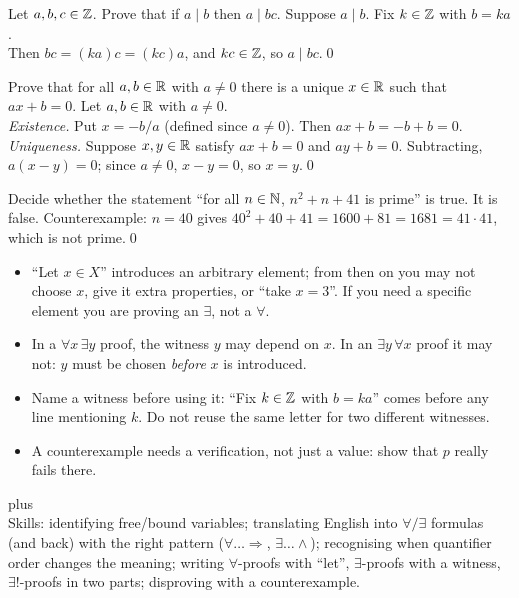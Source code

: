 \begin{hexample}
Let $a,b,c\in\mathbb{Z}$. Prove that if $a\mid b$ then $a\mid bc$.
\solution
Suppose $a\mid b$. Fix $k\in\mathbb{Z}$ with $b=ka$.\\
Then $bc=(ka)c=(kc)a$, and $kc\in\mathbb{Z}$, so $a\mid bc$.\qed
\end{hexample}

\begin{hexample}
Prove that for all $a,b\in\mathbb{R}$ with $a\neq0$ there is a unique $x\in\mathbb{R}$ such that $ax+b=0$.
\solution
Let $a,b\in\mathbb{R}$ with $a\neq0$.\\
\emph{Existence.} Put $x=-b/a$ (defined since $a\neq0$). Then $ax+b=-b+b=0$.\\
\emph{Uniqueness.} Suppose $x,y\in\mathbb{R}$ satisfy $ax+b=0$ and $ay+b=0$. Subtracting, $a(x-y)=0$; since $a\neq0$, $x-y=0$, so $x=y$.\qed
\end{hexample}

\begin{hexample}[counterexample]
Decide whether the statement ``for all $n\in\mathbb{N}$, $n^2+n+41$ is prime'' is true.
\solution
It is false. Counterexample: $n=40$ gives $40^2+40+41=1600+81=1681=41\cdot41$, which is not prime.\qed
\end{hexample}

\begin{warn}
\begin{itemize}
\item ``Let $x\in X$'' introduces an arbitrary element; from then on you may not choose $x$, give it extra properties, or ``take $x=3$''. If you need a specific element you are proving an $\exists$, not a $\forall$.
\item In a $\forall x\,\exists y$ proof, the witness $y$ may depend on $x$. In an $\exists y\,\forall x$ proof it may not: $y$ must be chosen \emph{before} $x$ is introduced.
\item Name a witness before using it: ``Fix $k\in\mathbb{Z}$ with $b=ka$'' comes before any line mentioning $k$. Do not reuse the same letter for two different witnesses.
\item A counterexample needs a verification, not just a value: show that $p$ really fails there.
\end{itemize}
\end{warn}

\begin{planning}[1.2]
\quad {}\quad {}\quad plus \\[3pt]
Skills: identifying free/bound variables; translating English into $\forall/\exists$ formulas (and back) with the right pattern ($\forall\dots\Rightarrow$, $\exists\dots\wedge$); recognising when quantifier order changes the meaning; writing $\forall$-proofs with ``let'', $\exists$-proofs with a witness, $\exists!$-proofs in two parts; disproving with a counterexample.
\end{planning}


